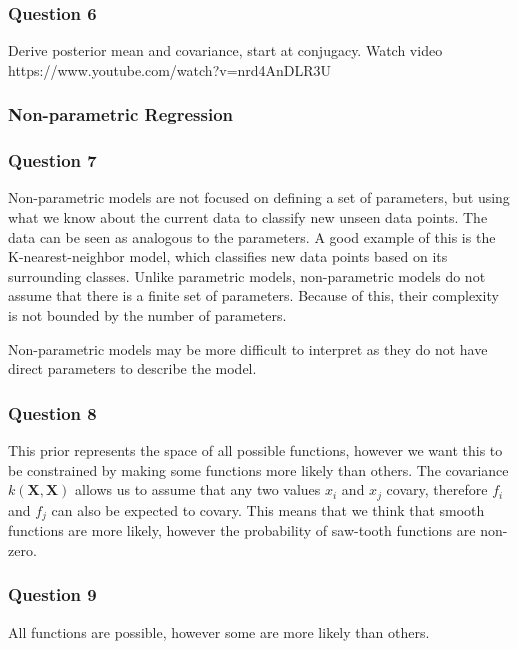 \documentclass[10pt, a4paper, twocolumn]{article} %
\begin{document}
\subsubsection*{Question 6}

Derive posterior mean and covariance, start at conjugacy. Watch video https://www.youtube.com/watch?v=nrd4AnDLR3U

\subsubsection{Non-parametric Regression}

\subsubsection*{Question 7}

Non-parametric models are not focused on defining a set of parameters, but using what we know about the current data to classify new unseen data points. The data can be seen as analogous to the parameters. A good example of this is the K-nearest-neighbor model, which classifies new data points based on its surrounding classes. Unlike parametric models, non-parametric models do not assume that there is a finite set of parameters. Because of this, their complexity is not bounded by the number of parameters. 
\par
Non-parametric models may be more difficult to interpret as they do not have direct parameters to describe the model. 

\subsubsection*{Question 8}

This prior represents the space of all possible functions, however we want this to be constrained by making some functions more likely than others. The covariance $ k(\mathbf{X}, \mathbf{X})$ allows us to assume that any two values $x_i$ and $x_j$ covary, therefore $f_i$ and $f_j$ can also be expected to covary. This means that we think that smooth functions are more likely, however the probability of saw-tooth functions are non-zero.

\subsubsection*{Question 9}

All functions are possible, however some are more likely than others. 
\end{document}
